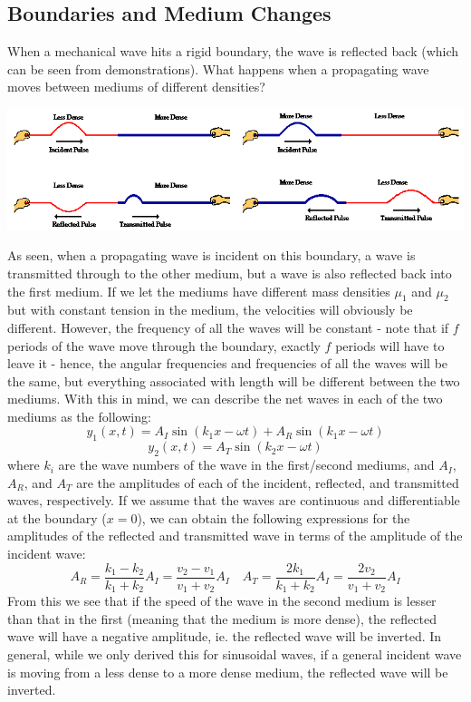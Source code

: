 \subsection{Boundaries and Medium Changes}
When a mechanical wave hits a rigid boundary, the wave is reflected back (which can be seen from demonstrations). What happens when a propagating wave moves between mediums of different densities? 
\begin{center}
\includegraphics[scale=0.8]{images/waves/mediumchange.png}\\
\end{center}
As seen, when a propagating wave is incident on this boundary, a wave is transmitted through to the other medium, but a wave is also reflected back into the first medium. If we let the mediums have different mass densities $\mu_1$ and $\mu_2$ but with constant tension in the medium, the velocities will obviously be different. However, the frequency of all the waves will be constant - note that if $f$ periods of the wave move through the boundary, exactly $f$ periods will have to leave it - hence, the angular frequencies and frequencies of all the waves will be the same, but everything associated with length will be different between the two mediums. With this in mind, we can describe the net waves in each of the two mediums as the following: 
\[
	y_1(x, t) = A_I \sin (k_1 x - \omega t) + A_R \sin (k_1 x - \omega t) 
\]
\[
	y_2(x, t) = A_T \sin (k_2 x - \omega t) 
\]
where $k_i$ are the wave numbers of the wave in the first/second mediums, and $A_I$, $A_R$, and $A_T$ are the amplitudes of each of the incident, reflected, and transmitted waves, respectively. If we assume that the waves are continuous and differentiable at the boundary ($x=0$), we can obtain the following expressions for the amplitudes of the reflected and transmitted wave in terms of the amplitude of the incident wave: 
\[
	A_R = \frac{k_1 - k_2}{k_1 + k_2} A_I = \frac{v_2 - v_1}{v_1+ v_2} A_I \quad A_T = \frac{2k_1}{k_1 + k_2} A_I = \frac{2v_2}{v_1+v_2} A_I
\]
From this we see that if the speed of the wave in the second medium is lesser than that in the first (meaning that the medium is more dense), the reflected wave will have a negative amplitude, ie. the reflected wave will be inverted. In general, while we only derived this for sinusoidal waves, if a general incident wave is moving from a less dense to a more dense medium, the reflected wave will be inverted. \\
